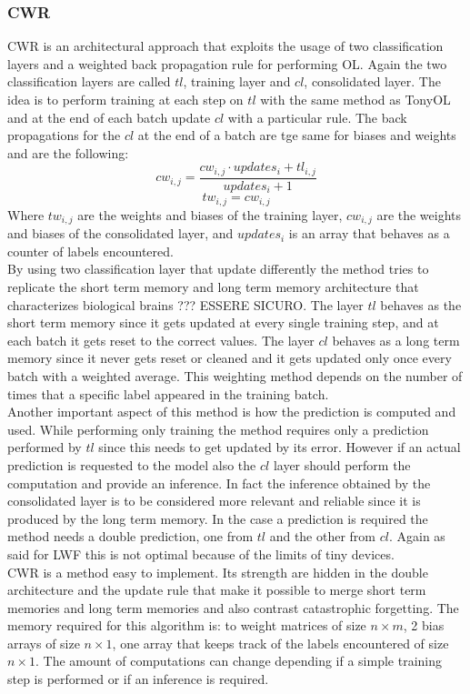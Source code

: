 \documentclass[12pt]{report}
\begin{document}
\subsubsection{CWR}
CWR is an architectural approach that exploits the usage of two classification layers and a weighted back propagation rule for performing OL. Again the two classification layers are called $tl$, training layer and $cl$, consolidated layer. The idea is to perform training at each step on $tl$ with the same method as TonyOL and at the end of each batch update $cl$ with a particular rule. The back propagations for the $cl$ at the end of a batch are tge same for biases and weights and are the following:
    \[     cw_{i,j} =  \frac{cw_{i,j} \cdot updates_{i} + tl_{i,j}}{updates_{i} + 1} \] 
    \[     tw_{i,j} =  cw_{i,j}\] 
Where $tw_{i,j}$ are the weights and biases of the training layer, $cw_{i,j}$ are the weights and biases of the consolidated layer, and $updates_{i}$ is an array that behaves as a counter of labels encountered.\\
By using two classification layer that update differently the method tries to replicate the short term memory and long term memory architecture that characterizes biological brains ??? ESSERE SICURO. The layer $tl$ behaves as the short term memory since it gets updated at every single training step, and at each batch it gets reset to the correct values. The layer $cl$ behaves as a long term memory since it never gets reset or cleaned and it gets updated only once every batch with a weighted average. This weighting method depends on the number of times that a specific label appeared in the training batch.\\
Another important aspect of this method is how the prediction is computed and used. While performing only training the method requires only a prediction performed by $tl$ since this needs to get updated by its error. However if an actual prediction is requested to the model also the $cl$ layer should perform the computation and provide an inference. In fact the inference obtained by the consolidated layer is to be considered more relevant and reliable since it is produced by the long term memory. In the case a prediction is required the method needs a double prediction, one from $tl$ and the other from $cl$. Again as said for LWF this is not optimal because of the limits of tiny devices. \\
CWR is a method easy to implement. Its strength are hidden in the double architecture and the update rule that make it possible to merge short term memories and long term memories and also contrast catastrophic forgetting. The memory required for this algorithm is: to weight matrices of size $n \times m$, 2 bias arrays of size $n \times 1$, one array that keeps track of the labels encountered of size $n \times 1$. The amount of computations can change depending if a simple training step is performed or if an inference is required.
\end{document}
